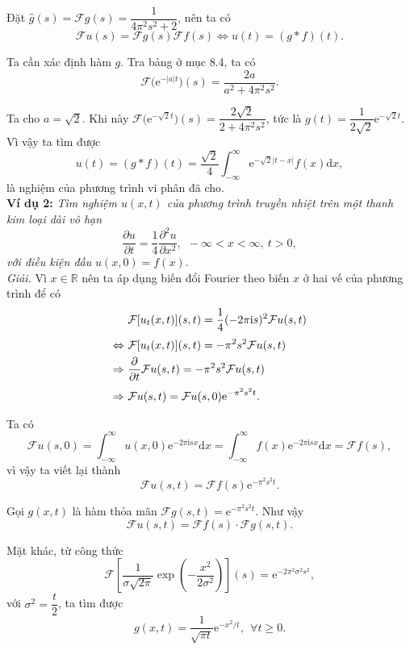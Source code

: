 \documentclass[10pt, a4paper]{article}
\begin{document}
	Đặt $\widehat g(s)=\mathcal Fg(s)=\dfrac{1}{4\pi^2s^2+2}$, nên ta có $$\mathcal Fu(s)=\mathcal Fg(s)\mathcal Ff(s)\iff u(t)=(g*f)(t).$$
	
	Ta cần xác định hàm $g$. Tra bảng ở mục 8.4, ta có $$\mathcal F\big(\mathrm e^{-|a|t}\big)(s)=\frac{2a}{a^2+4\pi^2s^2}.$$
	
	Ta cho $a=\sqrt2$. Khi này $\mathcal F\big(\mathrm e^{-\sqrt2t}\big)(s)=\dfrac{2\sqrt2}{2+4\pi^2s^2}$, tức là $g(t)=\dfrac{1}{2\sqrt2}\mathrm e^{-\sqrt2t}$. Vì vậy ta tìm được $$u(t)=(g*f)(t)=\frac{\sqrt2}{4}\int_{-\infty}^\infty\mathrm e^{-\sqrt2|t-x|}f(x)\mathrm dx,$$
	là nghiệm của phương trình vi phân đã cho.\\
	
	\textbf{Ví dụ 2:} \textit{Tìm nghiệm $u(x,t)$ của phương trình truyền nhiệt trên một thanh kim loại dài vô hạn} $$\frac{\partial u}{\partial t}=\frac14\frac{\partial^2u}{\partial x^2},~~-\infty<x<\infty,~t>0,$$
	\textit{với điều kiện đầu} $u(x,0)=f(x)$.\\
	
	\textit{Giải.} Vì $x\in\mathbb R$ nên ta áp dụng biến đổi Fourier theo biến $x$ ở hai vế của phương trình để có \begin{align*}
		&\mathcal F[u_t(x,t)](s,t)=\frac14(-2\pi\mathrm is)^2\mathcal Fu(s,t)\\
		\noalign{\vskip3pt}
		\Leftrightarrow~&\mathcal F[u_t(x,t)](s,t)=-\pi^2s^2\mathcal Fu(s,t)\\
		\Rightarrow~&\frac{\partial}{\partial t}\mathcal Fu(s,t)=-\pi^2s^2\mathcal Fu(s,t)\\
		\noalign{\vskip3pt}
		\Rightarrow~&\mathcal Fu(s,t)=\mathcal Fu(s,0)\mathrm e^{-\pi^2s^2t}.
	\end{align*}
	
	Ta có $$\mathcal Fu(s,0)=\int_{-\infty}^\infty u(x,0)\mathrm e^{-2\pi\mathrm isx}\mathrm dx=\int_{-\infty}^\infty f(x)\mathrm e^{-2\pi\mathrm isx}\mathrm dx=\mathcal Ff(s),$$
	vì vậy ta viết lại thành $$\mathcal Fu(s,t)=\mathcal Ff(s)\mathrm e^{-\pi^2s^2t}.$$
	
	Gọi $g(x,t)$ là hàm thỏa mãn $\mathcal Fg(s,t)=\mathrm e^{-\pi^2s^2t}$. Như vậy $$\mathcal Fu(s,t)=\mathcal Ff(s)\cdot\mathcal Fg(s,t).$$
	
	Mặt khác, từ công thức $$\mathcal F\left[\frac{1}{\sigma\sqrt{2\pi}}\exp\left(-\frac{x^2}{2\sigma^2}\right)\right](s)=\mathrm e^{-2\pi^2\sigma^2s^2},$$
	với $\sigma^2=\dfrac t2$, ta tìm được $$g(x,t)=\frac{1}{\sqrt{\pi t}}\mathrm e^{-x^2/t},~~\forall t\ge0.$$
	
\end{document}
